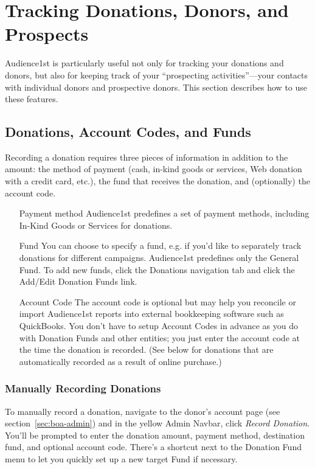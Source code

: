 
\section{Tracking Donations, Donors, and Prospects}
\label{sec:donor}

Audience1st is particularly useful not only for tracking your donations
and donors, but also for keeping track of your ``prospecting
activities''---your contacts with individual donors and prospective
donors.  This section describes how to use these features.

\subsection{Donations, Account Codes, and Funds}
\label{sec:donations}

Recording a donation requires three pieces of information in addition to
the amount: 
the method of payment (cash, in-kind goods or services, Web donation
with a credit card, etc.), the fund that receives the donation, and
(optionally) the account code.

\begin{itemize}
\item[Payment method] Audience1st predefines a set of payment methods,
  including In-Kind Goods or Services for donations.
\item[Fund] You can choose to specify a fund, e.g. if you'd like to
  separately track donations for different campaigns.  Audience1st
  predefines only the General Fund.  To add new funds, click the
  Donations navigation tab and click the Add/Edit Donation Funds link. 
\item[Account Code] The account code is optional but may help you 
  reconcile or import Audience1st reports into external bookkeeping
  software such as QuickBooks.  You don't have to setup Account Codes in
  advance as you do with Donation Funds and other entities; you just
  enter the account code at the time the donation is recorded.  (See
  below for donations that are automatically recorded as a result of
  online purchase.)
\end{itemize}

\subsubsection{Manually Recording Donations}
\label{sec:recording_donations}

To manually record a donation, navigate to the donor's account page (see
section~\ref{sec:boa-admin}) and in the yellow Admin Navbar, click
\emph{Record Donation}.  You'll be prompted to enter the donation
amount, payment method, destination fund, and optional account code.
There's a shortcut next to the Donation Fund menu to let you quickly set
up a new target Fund if necessary. 

